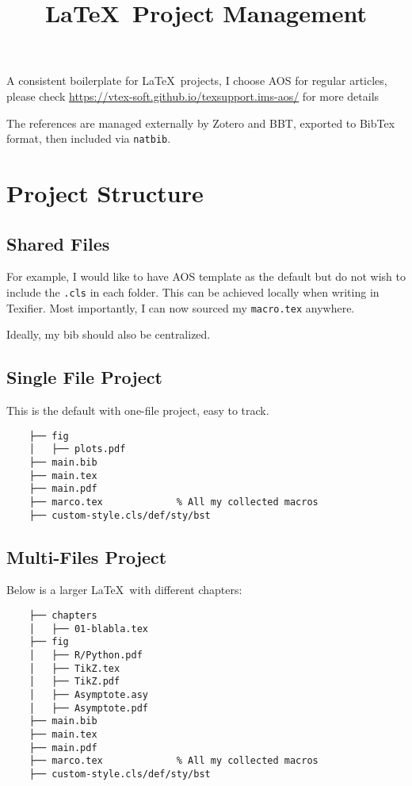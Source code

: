 \documentclass[aos,preprint]{imsart}
\begin{document}
\title{\LaTeX\ Project Management}

A consistent boilerplate for \LaTeX\ projects,
I choose AOS for regular articles, please check
\url{https://vtex-soft.github.io/texsupport.ims-aos/} for more details

The references are managed externally by Zotero and BBT,
exported to BibTex format, then included via \verb|natbib|.

\section{Project Structure}

\subsection{Shared Files}

For example, I would like to have AOS template as the default but do not wish
to include the \texttt{.cls} in each folder.
This can be achieved locally when writing in Texifier.
Most importantly, I can now sourced my \texttt{macro.tex} anywhere.

Ideally, my bib should also be centralized.


\subsection{Single File Project}

This is the default with one-file project, easy to track.

\begin{Verbatim}
	├── fig
	│   ├── plots.pdf
	├── main.bib
	├── main.tex
	├── main.pdf
	├── marco.tex             % All my collected macros
	├── custom-style.cls/def/sty/bst
\end{Verbatim}

\subsection{Multi-Files Project}

Below is a larger \LaTeX\ with different chapters:

\begin{Verbatim}
	├── chapters
	│   ├── 01-blabla.tex
	├── fig
	│   ├── R/Python.pdf
	│   ├── TikZ.tex
	│   ├── TikZ.pdf
	│   ├── Asymptote.asy
	│   ├── Asymptote.pdf
	├── main.bib
	├── main.tex
	├── main.pdf
	├── marco.tex             % All my collected macros
	├── custom-style.cls/def/sty/bst
\end{Verbatim}
\end{document}
